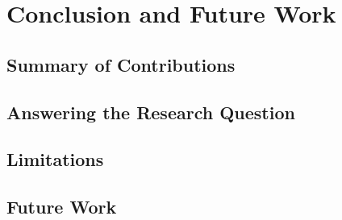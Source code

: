 \section{Conclusion and Future Work}
\label{chap:conclusion}

\subsection{Summary of Contributions}
\label{sec:summaryOfContributions}

\subsection{Answering the Research Question}
\label{sec:answeringResearchQuestion}

\subsection{Limitations}
\label{sec:conclusionLimitations}

\subsection{Future Work}
\label{sec:futureWork}
